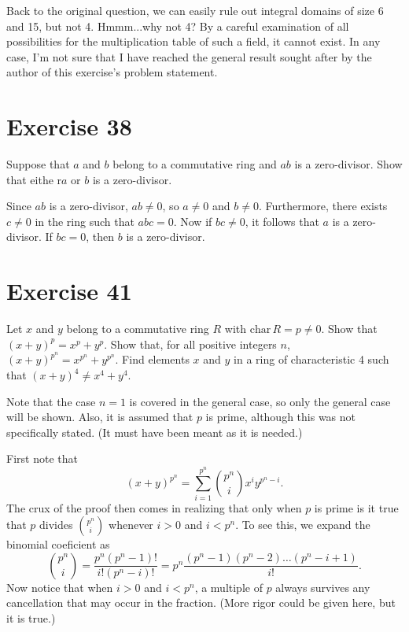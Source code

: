 \documentclass[12pt]{article}
\newcommand{\chr}{\mbox{char}\,}
\begin{document}
Back to the original question, we can easily rule out integral
domains of size 6 and 15, but not 4.  Hmmm...why not 4?
By a careful examination of all possibilities for the multiplication
table of such a field, it cannot exist.  In any case, I'm not sure
that I have reached the general result sought after by the
author of this exercise's problem statement.

\section*{Exercise 38}

Suppose that $a$ and $b$ belong to a commutative ring and $ab$
is a zero-divisor.  Show that eithe r$a$ or $b$ is a zero-divisor.

Since $ab$ is a zero-divisor, $ab\neq 0$, so $a\neq 0$ and $b\neq 0$.
Furthermore, there exists $c\neq 0$ in the ring such that $abc=0$.
Now if $bc\neq 0$, it follows that $a$ is a zero-divisor.  If $bc=0$,
then $b$ is a zero-divisor.

\section*{Exercise 41}

Let $x$ and $y$ belong to a commutative ring $R$ with $\chr R=p\neq 0$.
Show that $(x+y)^p=x^p+y^p$.  Show that, for all positive integers $n$,
$(x+y)^{p^n}=x^{p^n}+y^{p^n}$.  Find elements $x$ and $y$ in a ring of
characteristic 4 such that $(x+y)^4\neq x^4+y^4$.

Note that the case $n=1$ is covered in the general case, so only the general
case will be shown.  Also, it is assumed that $p$ is prime, although this was not
specifically stated.  (It must have been meant as it is needed.)

First note that
\begin{equation*}
(x+y)^{p^n}=\sum_{i=1}^{p^n}\binom{p^n}{i}x^iy^{p^n-i}.
\end{equation*}
The crux of the proof then comes in realizing that only when $p$ is prime is it
true that $p$ divides $\binom{p^n}{i}$ whenever $i>0$ and $i<p^n$.
To see this, we expand the binomial coeficient as
\begin{equation*}
\binom{p^n}{i}=\frac{p^n(p^n-1)!}{i!(p^n-i)!}=p^n\frac{(p^n-1)(p^n-2)\dots(p^n-i+1)}{i!}.
\end{equation*}
Now notice that when $i>0$ and $i<p^n$, a multiple of $p$ always
survives any cancellation that may occur in the fraction.  (More rigor could
be given here, but it is true.)
\end{document}
